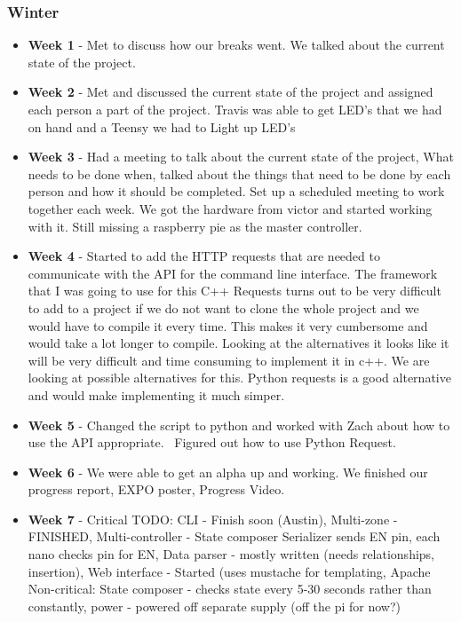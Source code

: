 \documentclass[onecolumn, draftclsnofoot,10pt, compsoc]{IEEEtran}
\begin{document}
			\subsubsection{Winter}
				\begin{itemize}
					\item \textbf{Week 1} - Met to discuss how our breaks went. We talked about the current state of the project.
					\item \textbf{Week 2} - Met and discussed the current state of the project and assigned each person a part of the project.  Travis was able to get LED's that we had on hand and a Teensy we had to Light up LED's
					\item \textbf{Week 3} - Had a meeting to talk about the current state of the project, What needs to be done when, talked about the things that need to be done by each person and how it should be completed. Set up a scheduled meeting to work together each week. We got the hardware from victor and started working with it. Still missing a raspberry pie as the master controller.
					\item \textbf{Week 4} - Started to add the HTTP requests that are needed to communicate with the API for the command line interface. The framework that I was going to use for this C++ Requests turns out to be very difficult to add to a project if we do not want to clone the whole project and we would have to compile it every time. This makes it very cumbersome and would take a lot longer to compile. Looking at the alternatives it looks like it will be very difficult and time consuming to implement it in c++. We are looking at possible alternatives for this. Python requests is a good alternative and would make implementing it much simper.
					\item \textbf{Week 5} - Changed the script to python and worked with Zach about how to use the API appropriate.  Figured out how to use Python Request.
					\item \textbf{Week 6} - We were able to get an alpha up and working. We finished our progress report, EXPO poster, Progress Video.
					\item \textbf{Week 7} - Critical TODO: CLI - Finish soon (Austin), Multi-zone - FINISHED, Multi-controller - State composer Serializer sends EN pin, each nano checks pin for EN, Data parser - mostly written (needs relationships, insertion), Web interface - Started (uses mustache for templating, Apache
											\\ Non-critical: State composer - checks state every 5-30 seconds rather than constantly, power - powered off separate supply (off the pi for now?)

\end{itemize}
\end{document}
